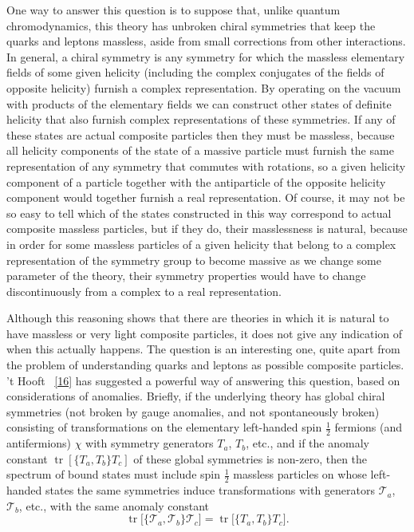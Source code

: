 One way to answer this question is to suppose that, unlike quantum
chromodynamics, this theory has unbroken chiral symmetries that keep the
quarks and leptons massless, aside from small corrections from other
interactions. In general, a chiral symmetry is any symmetry for which the
massless elementary fields of some given helicity (including the complex
conjugates of the fields of opposite helicity) furnish a complex
representation. By operating on the vacuum with products of the elementary
fields we can construct other states of definite helicity that also furnish
complex representations of these symmetries. If any of these states are
actual composite particles then they must be massless, because all
helicity components of the state of a massive particle must furnish the
same representation of any symmetry that commutes with rotations, so a
given helicity component of a particle together with the antiparticle of
the opposite helicity component would together furnish a real
representation. Of course, it may not be so easy to tell which of the
states constructed in this way correspond to actual composite massless
particles, but if they do, their masslessness is natural, because in order
for some massless particles of a given helicity that belong to a complex
representation of the symmetry group to become massive as we change some
parameter of the theory, their symmetry properties would have to change
discontinuously from a complex to a real representation.

Although this reasoning shows that there are theories in which it is
natural to have massless or very light composite particles, it does not
give any indication of when this actually happens. The question is an
interesting one, quite apart from the problem of understanding quarks and
leptons as possible composite particles. 't Hooft~%
\hyperref[ch22-ref-16]{[16]} has suggested a powerful way of answering
this question, based on considerations of anomalies. Briefly, if the
underlying theory has global chiral symmetries (not broken by gauge
anomalies, and not spontaneously broken) consisting of transformations on
the elementary left-handed spin $\frac12$ fermions (and antifermions)
$\chi$ with symmetry generators $T_a$, $T_b$, etc., and if the
anomaly constant
$\operatorname{tr}[\{T_a,T_b\}T_c]$ of these global
symmetries is non-zero, then the spectrum of bound states must include
spin $\frac12$ massless particles on whose left-handed states the same
symmetries induce transformations with generators $\mathcal T_a$,
$\mathcal T_b$, etc., with the same anomaly constant
\begin{equation}
 \operatorname{tr}
 \bigl[\{\mathcal T_a,\mathcal T_b\}\mathcal T_c\bigr]
 =
 \operatorname{tr}\bigl[\{T_a,T_b\}T_c\bigr].
 \tag{22.5.1}\label{eq:22.5.1}
\end{equation}

